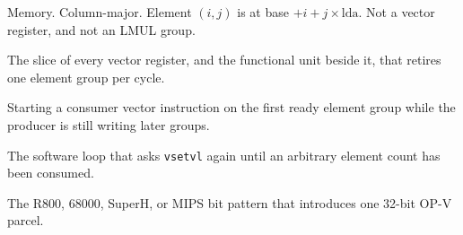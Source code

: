 \begin{description}[leftmargin=1.5em,style=nextline]
  \item[Matrix] Memory. Column-major. Element $(i, j)$ is at base $+ i + j \times \mathrm{lda}$. Not a vector register, and not an LMUL group.
  \item[Lane] The slice of every vector register, and the functional unit beside it, that retires one element group per cycle.
  \item[Chaining] Starting a consumer vector instruction on the first ready element group while the producer is still writing later groups.
  \item[Strip mining] The software loop that asks \texttt{vsetvl} again until an arbitrary element count has been consumed.
  \item[Host escape] The R800, 68000, SuperH, or MIPS bit pattern that introduces one 32-bit OP-V parcel.
\end{description}
